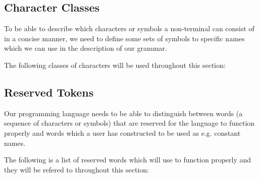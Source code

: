 \subsection{Character Classes}
To be able to describe which characters or symbols a non-terminal can consist of in a concise manner, we need to define some sets of symbols to specific names which we can use in the description of our grammar.

The following classes of characters will be used throughout this section:

\begin{ebnf}
\end{ebnf}

\subsection{Reserved Tokens}
Our programming language needs to be able to distinguish between words (a sequence of characters or symbols) that are reserved for the language to function properly and words which a user has constructed to be used as e.g. constant names.

The following is a list of reserved words which \productname{} will use to function properly and they will be refered to throughout this section:

\begin{ebnf}
\end{ebnf}

